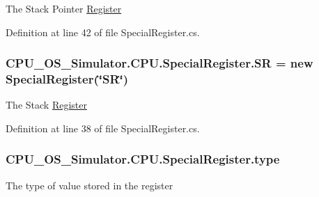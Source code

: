 The Stack Pointer \hyperlink{class_c_p_u___o_s___simulator_1_1_c_p_u_1_1_register}{Register} 



Definition at line 42 of file Special\+Register.\+cs.

\hypertarget{class_c_p_u___o_s___simulator_1_1_c_p_u_1_1_special_register_a556243e1c3c891e685bf884771c1575c}{}
\subsubsection[{S\+R}]{ C\+P\+U\+\_\+\+O\+S\+\_\+\+Simulator.\+C\+P\+U.\+Special\+Register.\+S\+R = new {\bf Special\+Register}(\char`\"{}S\+R\char`\"{})\hspace{0.3cm}{\ttfamily [static]}}\label{class_c_p_u___o_s___simulator_1_1_c_p_u_1_1_special_register_a556243e1c3c891e685bf884771c1575c}


The Stack \hyperlink{class_c_p_u___o_s___simulator_1_1_c_p_u_1_1_register}{Register} 



Definition at line 38 of file Special\+Register.\+cs.

\hypertarget{class_c_p_u___o_s___simulator_1_1_c_p_u_1_1_special_register_aae2bca6c1354013cca156bd19c30640d}{}
\subsubsection[{type}]{ C\+P\+U\+\_\+\+O\+S\+\_\+\+Simulator.\+C\+P\+U.\+Special\+Register.\+type\hspace{0.3cm}{\ttfamily [private]}}\label{class_c_p_u___o_s___simulator_1_1_c_p_u_1_1_special_register_aae2bca6c1354013cca156bd19c30640d}


The type of value stored in the register 

